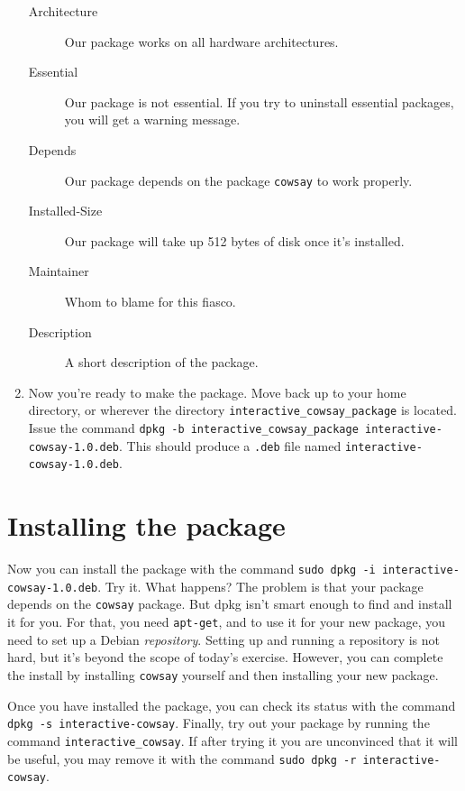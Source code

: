 \documentclass{article}
\begin{document}
\begin{enumerate}
\begin{description}
			\item[Architecture]Our package works on all hardware architectures.

			\item[Essential]Our package is not essential. If you try to uninstall essential packages, you will get a warning message.

			\item[Depends]Our package depends on the package \texttt{cowsay} to work properly.
				
			\item[Installed-Size]Our package will take up 512 bytes of disk once it's installed.

			\item[Maintainer]Whom to blame for this fiasco.

			\item[Description]A short description of the package.
		\end{description}
	\item Now you're ready to make the package. Move back up to your home directory, or wherever the directory \texttt{interactive\_cowsay\_package} is located. Issue the command \texttt{dpkg -b interactive\_cowsay\_package interactive-cowsay-1.0.deb}. This should produce a \texttt{.deb} file named \texttt{interactive-cowsay-1.0.deb}.
	\end{enumerate}
	\section{Installing the package}
	Now you can install the package with the command \texttt{sudo dpkg -i interactive-cowsay-1.0.deb}. Try it.
		What happens?
		The problem is that your package depends on the \texttt{cowsay} package. But dpkg isn't smart enough to find and install it for you. For that, you need \texttt{apt-get}, and to use it for your new package, you need to set up a Debian \emph{repository}. Setting up and running a repository is not hard, but it's beyond the scope of today's exercise.  However, you can complete the install by installing \texttt{cowsay} yourself and then installing your new package.
		
		Once you have installed the package, you can check its status with the command \texttt{dpkg -s interactive-cowsay}. Finally, try out your package by running the command \texttt{interactive\_cowsay}. If after trying it you are unconvinced that it will be useful, you may remove it with the command \texttt{sudo dpkg -r interactive-cowsay}.
		
\end{document}

